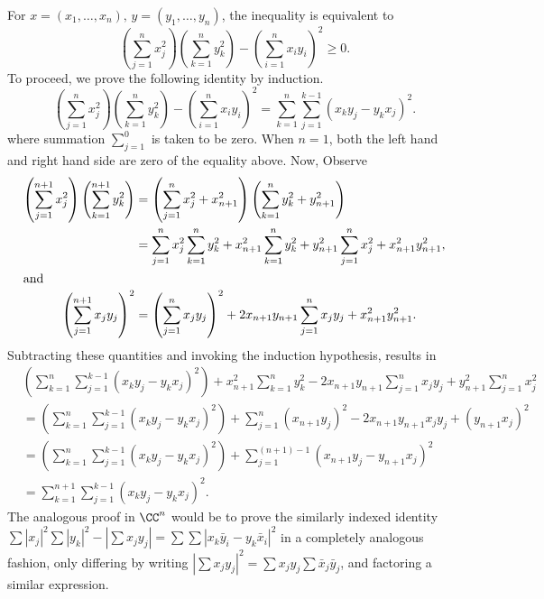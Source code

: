 \documentclass{homework}
\begin{document}
\begin{solution}
  For $x=(x_1,\dots,x_n),\,y=(y_1,\dots,y_n)$, the inequality is equivalent to
  $$
    \left(\sum_{j=1}^n x_j^2 \right)\left(\sum_{k=1}^n y_k^2 \right) - \left( \sum_{i=1}^nx_i y_i\right)^2 \ge 0.
  $$
  To proceed, we prove the following identity by induction.   
  $$
    \left(\sum_{j=1}^n x_j^2 \right)\left(\sum_{k=1}^n y_k^2 \right) - \left( \sum_{i=1}^nx_i y_i\right)^2
    = \sum_{k=1}^{n}\sum_{j=1}^{k-1}(x_k y_j - y_k x_j)^2.
  $$
  where summation $\sum_{j=1}^0$ is taken to be zero.  When $n=1$, both the left hand and right hand side are zero of the equality above.
  Now, Observe
  \begin{align*}
    \left(\sum_{j=1}^{n+1} x_j^2 \right)\left(\sum_{k=1}^{n+1} y_k^2 \right) 
    &= \left(\sum_{j=1}^n x_j^2 + x^2_{n+1}\right)\left(\sum_{k=1}^n y_k^2 + y^2_{n+1}\right) \\
    &= \sum_{j=1}^n x_j^2\sum_{k=1}^n y_k^2 + x^2_{n+1}\sum_{k=1}^n y_k^2 + y^2_{n+1}\sum_{j=1}^n x_j^2 + x_{n+1}^2y_{n+1}^2, \\
    \intertext{and}
    \left( \sum_{j=1}^{n+1}x_j y_j \right)^2 
    &= \left( \sum_{j=1}^nx_j y_j \right)^2 + 2x_{n+1}y_{n+1}\sum_{j=1}^n x_jy_j  + x_{n+1}^2y_{n+1}^2.
  \end{align*}
  Subtracting these quantities and invoking the induction hypothesis, results in
    \begin{align*}
    &\left(\sum_{k=1}^{n}\sum_{j=1}^{k-1}(x_k y_j - y_k x_j)^2\right) + 
    x^2_{n+1}\sum_{k=1}^n y_k^2 -2x_{n+1}y_{n+1}\sum_{j=1}^n x_jy_j+ y^2_{n+1}\sum_{j=1}^n x_j^2\\
    &= \left(\sum_{k=1}^{n}\sum_{j=1}^{k-1}(x_k y_j - y_k x_j)^2\right) + 
    \sum_{j=1}^n (x_{n+1}y_j)^2 -2x_{n+1}y_{n+1}x_jy_j + (y_{n+1}x_j)^2\\
    &= \left(\sum_{k=1}^{n}\sum_{j=1}^{k-1}(x_k y_j - y_k x_j)^2\right) + 
    \sum_{j=1}^{(n+1)-1} (x_{n+1}y_j - y_{n+1}x_j)^2\\
    &= \sum_{k=1}^{n+1}\sum_{j=1}^{k-1}(x_k y_j - y_k x_j)^2.
  \end{align*}
  The analogous proof in $\CC^n$ would be to prove the similarly indexed identity $\sum|x_j|^2\sum|y_k|^2 - |\sum x_jy_j| = \sum\sum|x_k\bar y_i - y_k \bar x_i|^2$ in a completely analogous fashion, only differing by writing $|\sum x_jy_j|^2 = \sum x_jy_j \sum \bar x_j \bar y_j$, and factoring a similar expression.
  
\end{solution}
\end{document}
